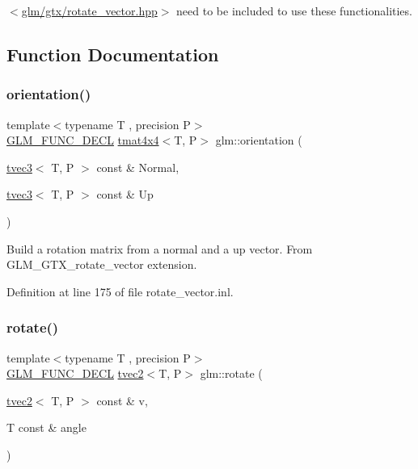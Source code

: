 $<$\mbox{\hyperlink{rotate__vector_8hpp}{glm/gtx/rotate\+\_\+vector.\+hpp}}$>$ need to be included to use these functionalities. 

\subsection{Function Documentation}
\mbox{\label{group__gtx__rotate__vector_ga49b4d082305cdfcfe0a5c184f684a902}} 
\subsubsection{\texorpdfstring{orientation()}{orientation()}}
{\footnotesize\ttfamily template$<$typename T , precision P$>$ \\
\mbox{\hyperlink{setup_8hpp_ab2d052de21a70539923e9bcbf6e83a51}{G\+L\+M\+\_\+\+F\+U\+N\+C\+\_\+\+D\+E\+CL}} \mbox{\hyperlink{structglm_1_1tmat4x4}{tmat4x4}}$<$T, P$>$ glm\+::orientation (\begin{DoxyParamCaption}\item[{\mbox{\hyperlink{structglm_1_1tvec3}{tvec3}}$<$ T, P $>$ const \&}]{Normal,  }\item[{\mbox{\hyperlink{structglm_1_1tvec3}{tvec3}}$<$ T, P $>$ const \&}]{Up }\end{DoxyParamCaption})}

Build a rotation matrix from a normal and a up vector. From G\+L\+M\+\_\+\+G\+T\+X\+\_\+rotate\+\_\+vector extension. 

Definition at line 175 of file rotate\+\_\+vector.\+inl.

\mbox{\label{group__gtx__rotate__vector_ga9bff444fb191e2e089a906b899cd033d}} 
\subsubsection{\texorpdfstring{rotate()}{rotate()}\hspace{0.1cm}{\footnotesize\ttfamily [1/3]}}
{\footnotesize\ttfamily template$<$typename T , precision P$>$ \\
\mbox{\hyperlink{setup_8hpp_ab2d052de21a70539923e9bcbf6e83a51}{G\+L\+M\+\_\+\+F\+U\+N\+C\+\_\+\+D\+E\+CL}} \mbox{\hyperlink{structglm_1_1tvec2}{tvec2}}$<$T, P$>$ glm\+::rotate (\begin{DoxyParamCaption}\item[{\mbox{\hyperlink{structglm_1_1tvec2}{tvec2}}$<$ T, P $>$ const \&}]{v,  }\item[{T const \&}]{angle }\end{DoxyParamCaption})}

